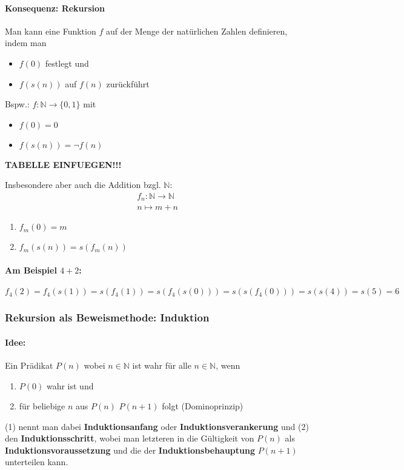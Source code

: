 \paragraph{Konsequenz: Rekursion}Man kann eine Funktion $f$ auf der Menge der natürlichen Zahlen definieren, indem man
\begin{itemize}
\item $f(0)$ festlegt und
\item $f(s(n))$ auf $f(n)$ zurückführt
\end{itemize}
Bspw.: $f:\mathbb{N}\rightarrow\{0,1\}$ mit
\begin{itemize}
\item $f(0)=0$
\item $f(s(n))=\neg f(n)$
\end{itemize}
\textbf{TABELLE EINFUEGEN!!!}

Insbesondere aber auch die Addition bzgl. $\mathbb{N}$:
\begin{align*}
f_n:\mathbb{N}\rightarrow\mathbb{N}\\
n\mapsto m+n
\end{align*}
\begin{enumerate}
\item $f_m(0)=m$
\item $f_m(s(n)) = s(f_m(n))$
\end{enumerate}

\paragraph{Am Beispiel $4+2$:}
\[
f_4(2)=f_4(s(1))=s(f_4(1))=s(f_4(s(0)))=s(s(f_4(0)))=s(s(4))=s(5)=6
\]
\subsubsection{Rekursion als Beweismethode: Induktion}
\paragraph{Idee:}Ein Prädikat $P(n)$ wobei $n\in\mathbb{N}$ ist wahr für alle $n\in\mathbb{N}$, wenn
\begin{enumerate}
\item $P(0)$ wahr ist und
\item für beliebige $n$ aus $P(n)$ $P(n+1)$ folgt (\glqq Dominoprinzip\grqq )
\end{enumerate}

(1) nennt man dabei \textbf{Induktionsanfang} oder \textbf{Induktionsverankerung} und (2) den \textbf{Induktionsschritt}, wobei man letzteren in die Gültigkeit von $P(n)$ als \textbf{Induktionsvoraussetzung} und die der \textbf{Induktionsbehauptung} $P(n+1)$ unterteilen kann.

